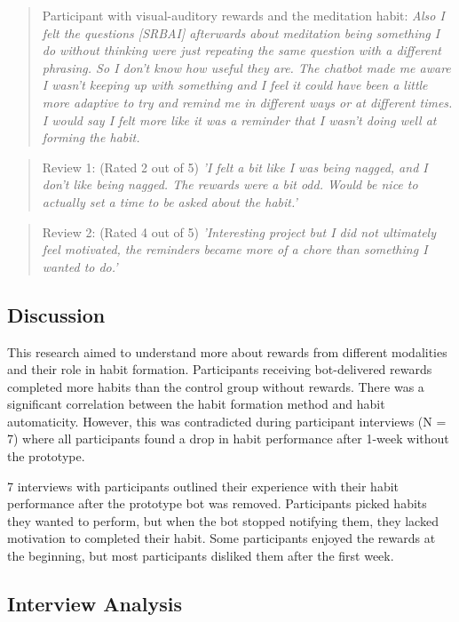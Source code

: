 \begin{quote}
Participant with visual-auditory rewards and the meditation habit: \textit{Also I felt the questions [SRBAI] afterwards about meditation being something I do without thinking were just repeating the same question with a different phrasing. So I don't know how useful they are. The chatbot made me aware I wasn't keeping up with something and I feel it could have been a little more adaptive to try and remind me in different ways or at different times. I would say I felt more like it was a reminder that I wasn't doing well at forming the habit.}
\end{quote}
\begin{quote}
Review 1: (Rated 2 out of 5) \textit{'I felt a bit like I was being nagged, and I don't like being nagged. The rewards were a bit odd. Would be nice to actually set a time to be asked about the habit.'}
\end{quote}
\begin{quote}
Review 2: (Rated 4 out of 5) \textit{'Interesting project but I did not ultimately feel motivated, the reminders became more of a chore than something I wanted to do.'}
\end{quote}

\subsection{Discussion}
This research aimed to understand more about rewards from different modalities and their role in habit formation. Participants receiving bot-delivered rewards completed more habits than the control group without rewards. There was a significant correlation between the habit formation method and habit automaticity. However, this was contradicted during participant interviews (N = 7) where all participants found a drop in habit performance after 1-week without the prototype.

7 interviews with participants outlined their experience with their habit performance after the prototype bot was removed. Participants picked habits they wanted to perform, but when the bot stopped notifying them, they lacked motivation to completed their habit. Some participants enjoyed the rewards at the beginning, but most participants disliked them after the first week.


\subsection{Interview Analysis}

